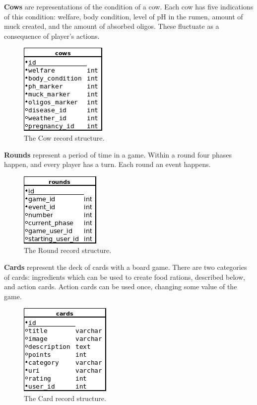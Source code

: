 \textbf{Cows} are representations of the condition of a cow. Each cow has five indications of this condition: welfare, body condition, level of pH in the rumen, amount of muck created, and the amount of absorbed oligos. These fluctuate as a consequence of player's actions.
\begin{figure}[ht]
\centering
\includegraphics{Images/2/cows}
\caption{The Cow record structure.}
\label{2_model_cow}
\end{figure}

\textbf{Rounds} represent a period of time in a game. Within a round four phases happen, and every player has a turn. Each round an event happens.
\begin{figure}[ht]
\centering
\includegraphics{Images/2/rounds}
\caption{The Round record structure.}
\label{2_model_round}
\end{figure}

\textbf{Cards} represent the deck of cards with a board game. There are two categories of cards: ingredients which can be used to create food rations, described below, and action cards. Action cards can be used once, changing some value of the game.
\begin{figure}[ht]
\centering
\includegraphics{Images/2/cards}
\caption{The Card record structure.}
\label{2_model_card}
\end{figure}

